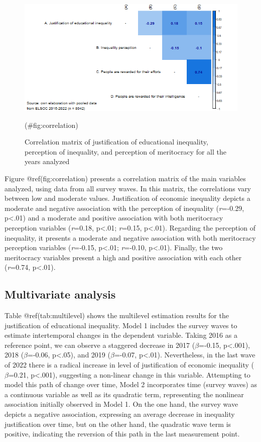 \documentclass[
  12pt,
  a4paper,
]{article}
\begin{document}
\begin{figure}[H]

{\centering \includegraphics[width=0.85\linewidth]{output/graphs/corr} 

}

\caption{Correlation matrix of justification of educational inequality, perception of inequality, and perception of meritocracy for all the years analyzed}(\#fig:correlation)
\end{figure}

Figure @ref(fig:correlation) presents a correlation matrix of the main
variables analyzed, using data from all survey waves. In this matrix,
the correlations vary between low and moderate values. Justification of
economic inequality depicts a moderate and negative association with the
perception of inequality (\emph{r}=-0.29, p\textless.01) and a moderate
and positive association with both meritocracy perception variables
(\emph{r}=0.18, p\textless.01; \emph{r}=0.15, p\textless.01). Regarding
the perception of inequality, it presents a moderate and negative
association with both meritocracy perception variables (\emph{r}=-0.15,
p\textless.01; \emph{r}=-0.10, p\textless.01). Finally, the two
meritocracy variables present a high and positive association with each
other (\emph{r}=0.74, p\textless.01).

\hypertarget{multivariate-analysis}{%
\subsection{Multivariate analysis}\label{multivariate-analysis}}

Table @ref(tab:multilevel) shows the multilevel estimation results for
the justification of educational inequality. Model 1 includes the survey
waves to estimate intertemporal changes in the dependent variable.
Taking 2016 as a reference point, we can observe a staggered decrease in
2017 (\(\beta\)=-0.15, p\textless.001), 2018 (\(\beta\)=-0.06,
p\textless.05), and 2019 (\(\beta\)=-0.07, p\textless.01). Nevertheless,
in the last wave of 2022 there is a radical increase in level of
justification of economic inequality (\(\beta\)=0.21, p\textless.001),
suggesting a non-linear change in this variable. Attempting to model
this path of change over time, Model 2 incorporates time (survey waves)
as a continuous variable as well as its quadratic term, representing the
nonlinear association initially observed in Model 1. On the one hand,
the survey wave depicts a negative association, expressing an average
decrease in inequality justification over time, but on the other hand,
the quadratic wave term is positive, indicating the reversion of this
path in the last measurement point.
\end{document}
